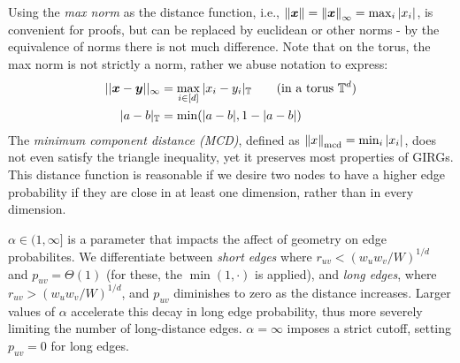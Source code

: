 
Using the \textit{max norm} as the distance function, i.e., $\left\lVert \bm{x}\right\rVert = \left\lVert \bm{x}\right\rVert_\infty = \max_i |x_i|$, is convenient for proofs, but can be replaced by euclidean or other norms - by the equivalence of norms there is not much difference. Note that on the torus, the max norm is not strictly a norm, rather we abuse notation to express:
\begin{align}
    ||\bm{x} - \bm{y}||_\infty &= \max_{i \in [d]} |x_i - y_i|_{\mathbb{T}}
    \quad\quad \text{(in a torus $\mathbb{T}^d$)}
    \\
    |a - b|_{\mathbb{T}} &= \min(|a - b|, 1 - |a - b|)
\end{align}
The \textit{minimum component distance (MCD)}, defined as $\left\lVert x\right\rVert_{\mathrm{mcd}} = \min_i |x_i|$, does not even satisfy the triangle inequality, yet it preserves most properties of GIRGs. This distance function is reasonable if we desire two nodes to have a higher edge probability if they are close in at least one dimension, rather than in every dimension.

$\alpha \in (1, \infty]$ is a parameter that impacts the affect of geometry on edge probabilites. We differentiate between \textit{short edges} where $r_{uv} < (w_u w_v / W)^{1/d}$ and $p_{uv} = \Theta(1)$ (for these, the $\min(1, \cdot)$ is applied), and \textit{long edges}, where $r_{uv} > (w_u w_v / W)^{1/d}$, and $p_{uv}$ diminishes to zero as the distance increases. Larger values of $\alpha$ accelerate this decay in long edge probability, thus more severely limiting the number of long-distance edges. $\alpha=\infty$ imposes a strict cutoff, setting $p_{uv} = 0$ for long edges.

